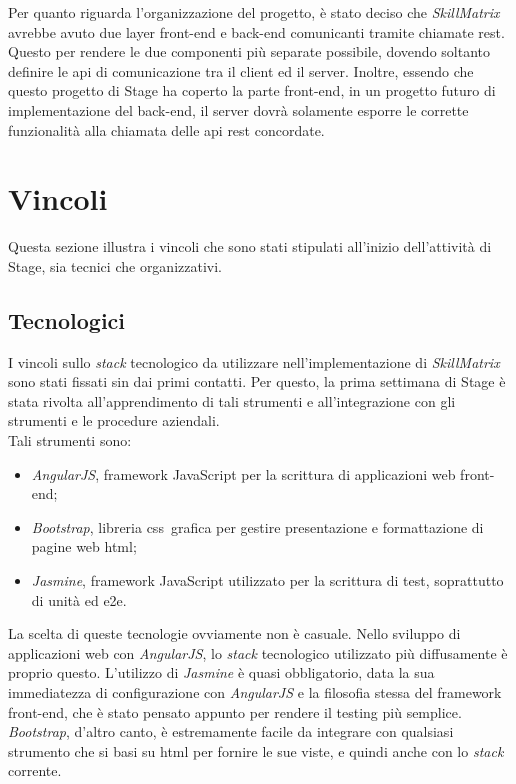 Per quanto riguarda l'organizzazione del progetto, è stato deciso che \emph{SkillMatrix} avrebbe avuto due layer \gls{front-end} e \gls{back-end} comunicanti tramite chiamate \gls{rest}. Questo per rendere le due componenti più separate possibile, dovendo soltanto definire le \gls{api} di comunicazione tra il client ed il server. Inoltre, essendo che questo progetto di Stage ha coperto la parte \gls{front-end}, in un progetto futuro di implementazione del \gls{back-end}, il server dovrà solamente esporre le corrette funzionalità alla chiamata delle \gls{api} \gls{rest} concordate.





\section{Vincoli}
Questa sezione illustra i vincoli che sono stati stipulati all'inizio dell'attività di Stage, sia tecnici che organizzativi.

\subsection{Tecnologici}
I vincoli sullo \emph{stack} tecnologico da utilizzare nell'implementazione di \emph{SkillMatrix} sono stati fissati sin dai primi contatti. Per questo, la prima settimana di Stage è stata rivolta all'apprendimento di tali strumenti e all'integrazione con gli strumenti e le procedure aziendali.\\
Tali strumenti sono:
\begin{itemize}
	\item \emph{AngularJS}, framework JavaScript per la scrittura di applicazioni web \gls{front-end};
	\item \emph{Bootstrap}, libreria \gls{css}\glsfirstoccur\  grafica per gestire presentazione e formattazione di pagine web \gls{html}\glsfirstoccur;
	\item \emph{Jasmine}, framework JavaScript utilizzato per la scrittura di test, soprattutto di unità ed \gls{e2e}\glsfirstoccur. 
\end{itemize}
La scelta di queste tecnologie ovviamente non è casuale. Nello sviluppo di applicazioni web con \emph{AngularJS}, lo \emph{stack} tecnologico utilizzato più diffusamente è proprio questo. L'utilizzo di \emph{Jasmine} è quasi obbligatorio, data la sua immediatezza di configurazione con \emph{AngularJS} e la filosofia stessa del framework \gls{front-end}, che è stato pensato appunto per rendere il testing più semplice.\\
\emph{Bootstrap}, d'altro canto, è estremamente facile da integrare con qualsiasi strumento che si basi su \gls{html} per fornire le sue viste, e quindi anche con lo \emph{stack} corrente.

